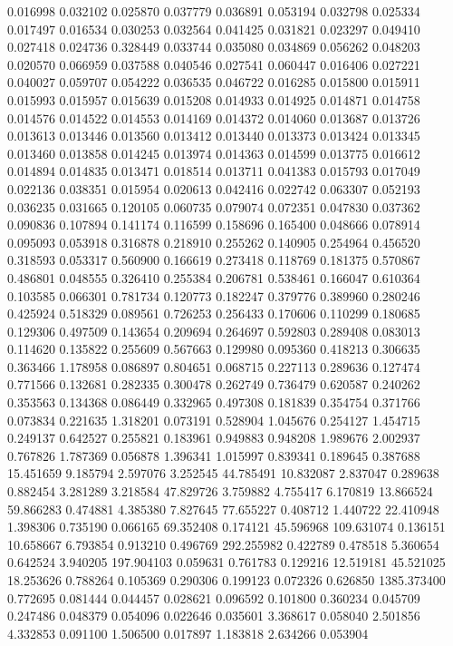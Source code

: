 0.016998
0.032102
0.025870
0.037779
0.036891
0.053194
0.032798
0.025334
0.017497
0.016534
0.030253
0.032564
0.041425
0.031821
0.023297
0.049410
0.027418
0.024736
0.328449
0.033744
0.035080
0.034869
0.056262
0.048203
0.020570
0.066959
0.037588
0.040546
0.027541
0.060447
0.016406
0.027221
0.040027
0.059707
0.054222
0.036535
0.046722
0.016285
0.015800
0.015911
0.015993
0.015957
0.015639
0.015208
0.014933
0.014925
0.014871
0.014758
0.014576
0.014522
0.014553
0.014169
0.014372
0.014060
0.013687
0.013726
0.013613
0.013446
0.013560
0.013412
0.013440
0.013373
0.013424
0.013345
0.013460
0.013858
0.014245
0.013974
0.014363
0.014599
0.013775
0.016612
0.014894
0.014835
0.013471
0.018514
0.013711
0.041383
0.015793
0.017049
0.022136
0.038351
0.015954
0.020613
0.042416
0.022742
0.063307
0.052193
0.036235
0.031665
0.120105
0.060735
0.079074
0.072351
0.047830
0.037362
0.090836
0.107894
0.141174
0.116599
0.158696
0.165400
0.048666
0.078914
0.095093
0.053918
0.316878
0.218910
0.255262
0.140905
0.254964
0.456520
0.318593
0.053317
0.560900
0.166619
0.273418
0.118769
0.181375
0.570867
0.486801
0.048555
0.326410
0.255384
0.206781
0.538461
0.166047
0.610364
0.103585
0.066301
0.781734
0.120773
0.182247
0.379776
0.389960
0.280246
0.425924
0.518329
0.089561
0.726253
0.256433
0.170606
0.110299
0.180685
0.129306
0.497509
0.143654
0.209694
0.264697
0.592803
0.289408
0.083013
0.114620
0.135822
0.255609
0.567663
0.129980
0.095360
0.418213
0.306635
0.363466
1.178958
0.086897
0.804651
0.068715
0.227113
0.289636
0.127474
0.771566
0.132681
0.282335
0.300478
0.262749
0.736479
0.620587
0.240262
0.353563
0.134368
0.086449
0.332965
0.497308
0.181839
0.354754
0.371766
0.073834
0.221635
1.318201
0.073191
0.528904
1.045676
0.254127
1.454715
0.249137
0.642527
0.255821
0.183961
0.949883
0.948208
1.989676
2.002937
0.767826
1.787369
0.056878
1.396341
1.015997
0.839341
0.189645
0.387688
15.451659
9.185794
2.597076
3.252545
44.785491
10.832087
2.837047
0.289638
0.882454
3.281289
3.218584
47.829726
3.759882
4.755417
6.170819
13.866524
59.866283
0.474881
4.385380
7.827645
77.655227
0.408712
1.440722
22.410948
1.398306
0.735190
0.066165
69.352408
0.174121
45.596968
109.631074
0.136151
10.658667
6.793854
0.913210
0.496769
292.255982
0.422789
0.478518
5.360654
0.642524
3.940205
197.904103
0.059631
0.761783
0.129216
12.519181
45.521025
18.253626
0.788264
0.105369
0.290306
0.199123
0.072326
0.626850
1385.373400
0.772695
0.081444
0.044457
0.028621
0.096592
0.101800
0.360234
0.045709
0.247486
0.048379
0.054096
0.022646
0.035601
3.368617
0.058040
2.501856
4.332853
0.091100
1.506500
0.017897
1.183818
2.634266
0.053904
